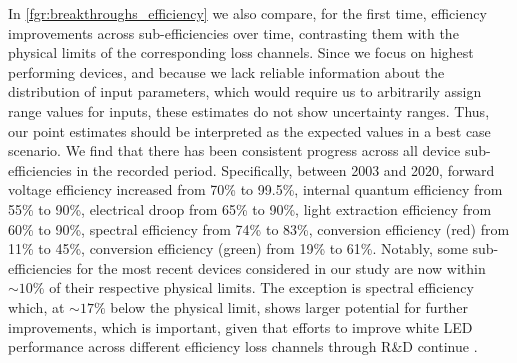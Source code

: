 \documentclass[parskip=full]{article}
\begin{document}
In \cref{fgr:breakthroughs_efficiency} we also compare, for the first time, efficiency improvements across sub-efficiencies over time, contrasting them with the physical limits of the corresponding loss channels. Since we focus on highest performing devices, and because we lack reliable information about the distribution of input parameters, which would require us to arbitrarily assign range values for inputs, these estimates do not show uncertainty ranges. Thus, our point estimates should be interpreted as the expected values in a best case scenario. We find that there has been consistent progress across all device sub-efficiencies in the recorded period. Specifically, between 2003 and 2020, forward voltage efficiency increased from 70\% to 99.5\%, internal quantum efficiency from 55\% to 90\%, electrical droop from 65\% to 90\%, light extraction efficiency from 60\% to 90\%, spectral efficiency from 74\% to 83\%, conversion efficiency (red) from 11\% to 45\%, conversion efficiency (green) from 19\% to 61\%. Notably, some sub-efficiencies for the most recent devices considered in our study are now within $\sim10\%$ of their respective physical limits. The exception is spectral efficiency which, at $\sim17\%$ below the physical limit, shows larger potential for further improvements, which is important, given that efforts to improve white LED performance across different efficiency loss channels through R\&D continue \cite{cho2017white, Weisbuch2020}. 
\end{document}

